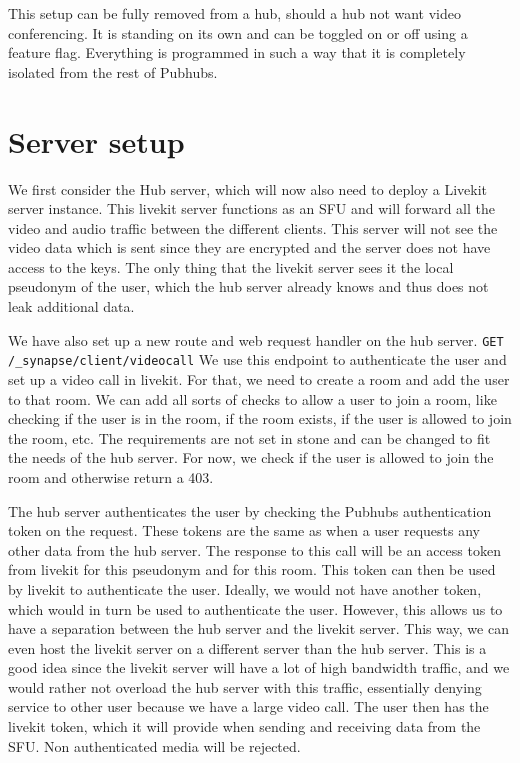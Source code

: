 \documentclass{report}
\begin{document}
    This setup can be fully removed from a hub, should a hub not want video conferencing. It is standing on its own and
    can be toggled on or off using a feature flag. Everything is programmed in such a way that it is completely isolated
    from the rest of Pubhubs.


    \section{Server setup}
    We first consider the Hub server, which will now also need to deploy a Livekit server instance. This livekit server
    functions as an SFU and will forward all the video and audio traffic between the different clients. This server will
    not see the video data which is sent since they are encrypted and the server does not have access to the keys. The
    only thing that the livekit server sees it the local pseudonym of the user, which the hub server already knows and
    thus does not leak additional data.

    We have also set up a new route and web request handler on the hub server.
    \texttt{GET /\_synapse/client/videocall} We use this endpoint to authenticate the user and set up a video call
    in livekit. For that, we need to create a room and add the user to that room. We can add all sorts of checks to allow
    a user to join a room, like checking if the user is in the room, if the room exists, if the user is allowed to
    join the room, etc. The requirements are not set in stone and can be changed to fit the needs of the hub server.
    For now, we check if the user is allowed to join the room and otherwise return a 403.

    The hub server authenticates the user by checking the Pubhubs authentication token on the request. These tokens are
    the same as when a user requests any other data from the hub server. The response to this call will be an
    access token from livekit for this pseudonym and for this room. This token can then be used by livekit to
    authenticate the user. Ideally, we would not have another token, which would in turn be used to authenticate the
    user. However, this allows us to have a separation between the hub server and the livekit server. This way, we can
    even host the livekit server on a different server than the hub server. This is a good idea since the
    livekit server will have a lot of high bandwidth traffic, and we would rather not overload the hub server with
    this traffic, essentially denying service to other user because we have a large video call. The user then
    has the livekit token, which it will provide when sending and receiving data from the SFU. Non authenticated
    media will be rejected.
\end{document}
